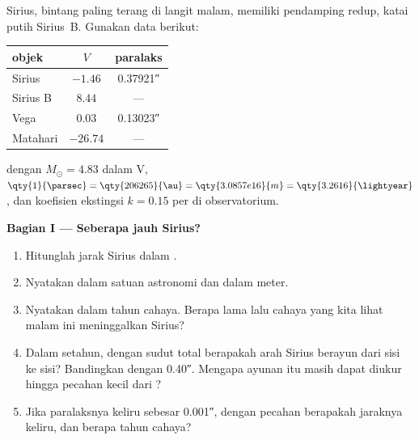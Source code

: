 \begin{problem}
\label{pb:b1:observing-the-sky:1}
Sirius, bintang paling terang di langit malam, memiliki pendamping redup, katai putih Sirius~B. Gunakan data berikut:
\begin{center}
\small
\begin{tabular}{lcc}
\hline
objek & $V$ & paralaks \\
\hline
Sirius & $-1.46$ & \ang{;;0.37921} \\
Sirius B & $8.44$ & --- \\
Vega & $0.03$ & \ang{;;0.13023} \\
Matahari & $-26.74$ & --- \\
\hline
\end{tabular}
\end{center}
dengan $M_\odot = 4.83$ dalam V, $\qty{1}{\parsec} = \qty{206265}{\au} =
\qty{3.0857e16}{m} = \qty{3.2616}{\lightyear}$, dan koefisien ekstingsi $k = 0.15$ per  di observatorium.

\medskip
\noindent\textbf{Bagian I --- Seberapa jauh Sirius?}
\begin{enumerate}
  \item Hitunglah jarak Sirius dalam .
  \item Nyatakan dalam satuan astronomi dan dalam meter.
  \item Nyatakan dalam tahun cahaya. Berapa lama lalu cahaya yang kita lihat malam ini meninggalkan Sirius?
  \item Dalam setahun, dengan sudut total berapakah arah Sirius berayun dari sisi ke sisi? Bandingkan dengan  \ang{;;0.40}. Mengapa ayunan itu masih dapat diukur hingga pecahan kecil dari ?
  \item Jika paralaksnya keliru sebesar \ang{;;0.001}, dengan pecahan berapakah jaraknya keliru, dan berapa tahun cahaya?
\end{enumerate}


\end{problem}
